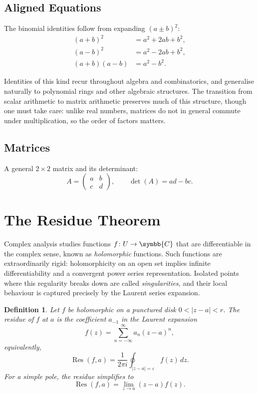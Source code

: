 \documentclass{article}
\newtheorem{definition}[theorem]{Definition}
\begin{document}
\subsection{Aligned Equations}

The binomial identities follow from expanding $(a \pm b)^2$:
\begin{align}
  (a + b)^{2}      &= a^{2} + 2ab + b^{2},      \\
  (a - b)^{2}      &= a^{2} - 2ab + b^{2},      \\
  (a + b)(a - b)   &= a^{2} - b^{2}.
\end{align}

Identities of this kind recur throughout algebra and combinatorics, and generalise
naturally to polynomial rings and other algebraic structures. The transition from
scalar arithmetic to matrix arithmetic preserves much of this structure, though one
must take care: unlike real numbers, matrices do not in general commute under
multiplication, so the order of factors matters.

\subsection{Matrices}

A general $2 \times 2$ matrix and its determinant:
\begin{equation}
  A = \begin{pmatrix} a & b \\ c & d \end{pmatrix}, \qquad
  \det(A) = ad - bc.
\end{equation}

\section{The Residue Theorem}

Complex analysis studies functions $f\colon U \to \symbb{C}$ that are differentiable
in the complex sense, known as \emph{holomorphic} functions. Such functions are
extraordinarily rigid: holomorphicity on an open set implies infinite differentiability
and a convergent power series representation. Isolated points where this regularity
breaks down are called \emph{singularities}, and their local behaviour is captured
precisely by the Laurent series expansion.

\begin{definition}
  Let $f$ be holomorphic on a punctured disk $0 < |z - a| < r$.  The \emph{residue}
  of $f$ at $a$ is the coefficient $a_{-1}$ in the Laurent expansion
  \begin{equation}
    f(z) = \sum_{n=-\infty}^{\infty} a_n (z - a)^n,
  \end{equation}
  equivalently,
  \begin{equation}
    \operatorname{Res}(f, a)
      = \frac{1}{2\pi i} \oint_{|z-a|=\varepsilon} f(z)\,dz.
  \end{equation}
  For a simple pole, the residue simplifies to
  \begin{equation}
    \operatorname{Res}(f, a) = \lim_{z \to a}(z - a)f(z).
  \end{equation}
\end{definition}
\end{document}
